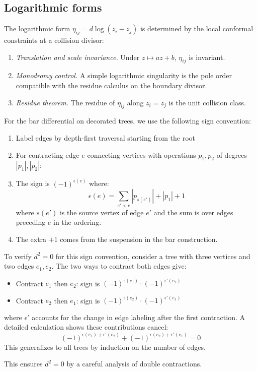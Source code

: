 \subsection{Logarithmic forms}

\begin{proposition}\label{prop:log-forms-conformal-invariance}
The logarithmic form
$\eta_{ij}=d\log(z_i-z_j)$ is determined by the local conformal
constraints at a collision divisor:
\begin{enumerate}
\item \emph{Translation and scale invariance.} Under
 $z\mapsto az+b$, $\eta_{ij}$ is invariant.
\item \emph{Monodromy control.} A simple logarithmic singularity is
 the pole order compatible with the residue calculus on the boundary
 divisor.
\item \emph{Residue theorem.} The residue of $\eta_{ij}$ along
 $z_i=z_j$ is the unit collision class.
\end{enumerate}
\end{proposition}

\begin{convention}
For the bar differential on decorated trees, we use the following sign convention:
\begin{enumerate}
\item Label edges by depth-first traversal starting from the root
\item For contracting edge $e$ connecting vertices with operations $p_1, p_2$ of degrees $|p_1|, |p_2|$:
\item The sign is $(-1)^{\epsilon(e)}$ where:
\[\epsilon(e) = \sum_{e' < e} |p_{s(e')}| + |p_1| + 1\]
where $s(e')$ is the source vertex of edge $e'$ and the sum is over edges preceding $e$ in the ordering.
\item The extra $+1$ comes from the suspension in the bar construction.
\end{enumerate}

To verify $d^2 = 0$ for this sign convention, consider a tree with three vertices and two edges $e_1, e_2$. The two ways to contract both edges give:
\begin{itemize}
\item Contract $e_1$ then $e_2$: sign is $(-1)^{\epsilon(e_1)} \cdot (-1)^{\epsilon'(e_2)}$
\item Contract $e_2$ then $e_1$: sign is $(-1)^{\epsilon(e_2)} \cdot (-1)^{\epsilon'(e_1)}$
\end{itemize}
where $\epsilon'$ accounts for the change in edge labeling after the first contraction. A detailed calculation shows these contributions cancel:
\[(-1)^{\epsilon(e_1) + \epsilon'(e_2)} + (-1)^{\epsilon(e_2) + \epsilon'(e_1)} = 0\]
This generalizes to all trees by induction on the number of edges.

This ensures $d^2 = 0$ by a careful analysis of double contractions.
\end{convention}

